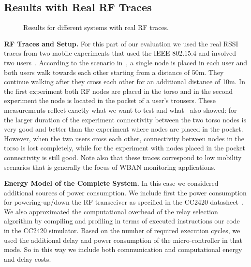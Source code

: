 \documentclass[10pt]{IEEEtran}
\newcounter{section:outage-analysis}
\begin{document}
\subsection{Results with Real RF Traces}
\begin{figure}[t]
\begin{center}
\hspace{-0.3cm}

\hspace{-0.3cm}
\caption{Results for different systems with real RF traces.}
  \label{fig:real-traces}
\end{center}
\end{figure}
\textbf{RF Traces and Setup.} For this part of our evaluation we used the real RSSI traces from two mobile experiments that used the IEEE 802.15.4 and involved two users~\cite{Miluzzo08radiocharacterization}. According to the scenario in~\cite{Miluzzo08radiocharacterization}, a single node is placed in each user and both users walk towards each other starting from a distance of 50m. They continue walking after they cross each other for an additional distance of 10m. In the first experiment both RF nodes are placed in the torso and in the second experiment the node is located in the pocket of a user's trousers. These measurements reflect exactly what we want to test and what~\cite{Miluzzo08radiocharacterization} also showed: for the larger duration of the experiment connectivity between the two torso nodes is very good and better than the experiment where nodes are placed in the pocket. However, when the two users cross each other, connectivity between nodes in the torso is lost completely, while for the experiment with nodes placed in the pocket connectivity is still good. Note also that these traces correspond to low mobility scenarios that is generally the focus of WBAN monitoring applications.

\textbf{Energy Model of the Complete System.} In this case we considered additional sources of power consumption. We include first the power consumption for powering-up/down the RF transceiver as specified in the CC2420 datasheet~\cite{cc2420}. We also approximated the computational overhead of the relay selection algorithm by compiling and profiling in terms of executed instructions our code in the CC2420 simulator. Based on the number of required execution cycles, we used the additional delay and power consumption of the micro-controller in that mode. So in this way we include both communication and computational energy and delay costs.
\end{document}

